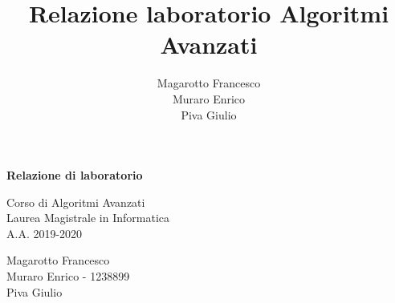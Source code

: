 \documentclass[a4paper]{article}
\title{Relazione laboratorio Algoritmi Avanzati}
\author{Magarotto Francesco\\Muraro Enrico\\Piva Giulio}
\begin{document}
\begin{titlepage}
  \vspace*{5cm}
  \begin{center}
    \Large\bfseries
	Relazione di laboratorio
  \end{center}
  \begin{center}
  \large
  Corso di Algoritmi Avanzati\\
  Laurea Magistrale in Informatica\\A.A. 2019-2020
  \end{center}
  \vspace{4cm plus 1fill}
  \begin{flushleft}
  \large
    Magarotto Francesco\\Muraro Enrico - 1238899\\Piva Giulio
  \end{flushleft}
\end{titlepage}
\newpage



\newpage

\end{document}

